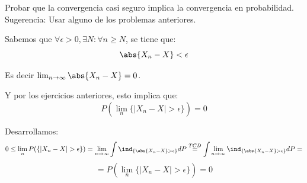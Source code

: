 \begin{problem}[10]Probar que la convergencia casi seguro implica la convergencia en probabilidad. Sugerencia: Usar alguno de los
problemas anteriores.


\solution

Sabemos que $\forall \epsilon > 0, \exists N: \forall n \geq N$, se tiene que:
\[
\abs{X_n -X} < \epsilon
\]

Es decir $\lim_{n \rightarrow \infty} \abs{X_n-X}=0$.

Y por los ejercicios anteriores, esto implica que:
\[
P(\lim_n\{ |X_n - X| > \epsilon\})= 0
\]

Desarrollamos:
\[
0 \leq \lim_n P(\{ |X_n - X| > \epsilon\})=\lim_{n \rightarrow \infty} \int  \ind_{\{\abs{X_n-X}>\epsilon\}} dP \stackrel{TCD}{=} \int \lim_{n \rightarrow \infty}  \ind_{\{\abs{X_n-X}>\epsilon\}} dP =
\]
\[
= P(\lim_n\{ |X_n - X| > \epsilon\})= 0
\]


\end{problem}






